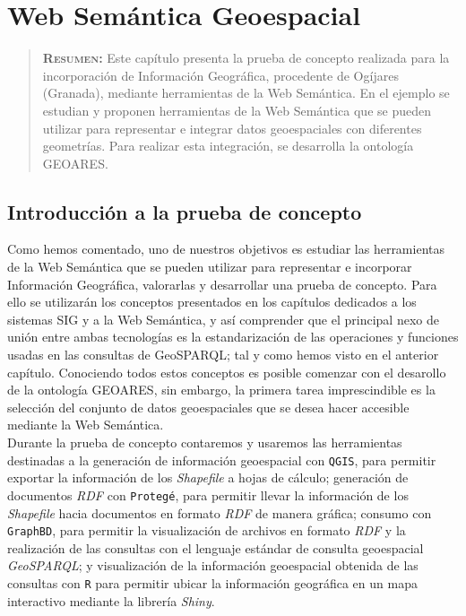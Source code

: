 \chapter{Web Semántica Geoespacial}
\label{ch:capitulo5}

\begin{quote}
	{\bf\textsc{Resumen:}} Este capítulo presenta la prueba de concepto realizada para la incorporación de Información Geográfica, procedente de Ogíjares (Granada), mediante herramientas de la Web Semántica. En el ejemplo se estudian y proponen herramientas de la Web Semántica que se pueden utilizar para representar e integrar datos geoespaciales con diferentes geometrías. Para realizar esta integración, se desarrolla la ontología GEOARES. 
\end{quote}



\section{Introducción a la prueba de concepto}

Como hemos comentado, uno de nuestros objetivos es estudiar las herramientas de la Web Semántica que se pueden utilizar para representar e incorporar Información Geográfica, valorarlas y desarrollar una prueba de concepto. Para ello se utilizarán los conceptos presentados en los capítulos dedicados a los sistemas SIG y a la Web Semántica, y así comprender que el principal nexo de unión entre ambas tecnologías es la estandarización de las operaciones y funciones usadas en las consultas de GeoSPARQL; tal y como hemos visto en el anterior capítulo. Conociendo todos estos conceptos es posible comenzar con el desarollo de la ontología GEOARES, sin embargo, la primera tarea imprescindible es la selección del conjunto de datos geoespaciales que se desea hacer accesible mediante la Web Semántica. \\

Durante la prueba de concepto contaremos y usaremos las herramientas destinadas a la generación de información geoespacial con \texttt{QGIS}, para permitir exportar la información de los \textit{Shapefile} a hojas de cálculo; generación de documentos \textit{RDF} con \texttt{Protegé}, para permitir llevar la información de los \textit{Shapefile} hacia documentos en formato \textit{RDF} de manera gráfica; consumo con \texttt{GraphBD},  para permitir la visualización de archivos en formato \textit{RDF} y la realización de las consultas con el lenguaje estándar de consulta geoespacial \textit{GeoSPARQL}; y visualización de la información geoespacial obtenida de las consultas con \texttt{R} para permitir ubicar la información geográfica en un mapa interactivo mediante la librería \textit{Shiny}.\\


